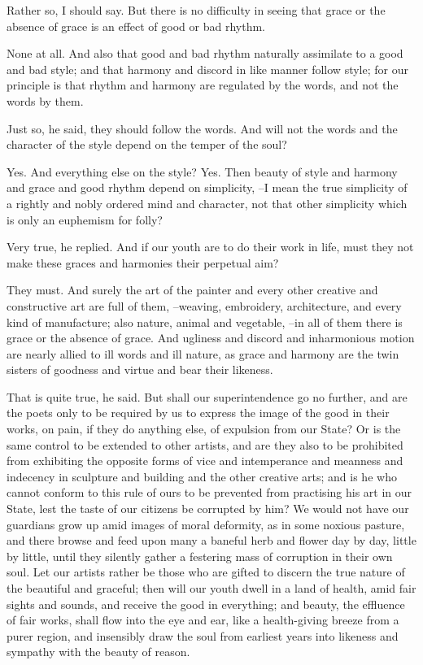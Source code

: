 Rather so, I should say.
But there is no difficulty in seeing that grace or the absence of grace is an effect of good or bad rhythm.

None at all.
And also that good and bad rhythm naturally assimilate to a good and bad style; and that harmony and discord in like manner follow style; for our principle is that rhythm and harmony are regulated by the words, and not the words by them.

Just so, he said, they should follow the words.
And will not the words and the character of the style depend on the temper of the soul?

Yes.
And everything else on the style?
Yes.
Then beauty of style and harmony and grace and good rhythm depend on simplicity, --I mean the true simplicity of a rightly and nobly ordered mind and character, not that other simplicity which is only an euphemism for folly?

Very true, he replied.
And if our youth are to do their work in life, must they not make these graces and harmonies their perpetual aim?

They must.
And surely the art of the painter and every other creative and constructive art are full of them, --weaving, embroidery, architecture, and every kind of manufacture; also nature, animal and vegetable, --in all of them there is grace or the absence of grace. And ugliness and discord and inharmonious motion are nearly allied to ill words and ill nature, as grace and harmony are the twin sisters of goodness and virtue and bear their likeness.

That is quite true, he said.
But shall our superintendence go no further, and are the poets only to be required by us to express the image of the good in their works, on pain, if they do anything else, of expulsion from our State? Or is the same control to be extended to other artists, and are they also to be prohibited from exhibiting the opposite forms of vice and intemperance and meanness and indecency in sculpture and building and the other creative arts; and is he who cannot conform to this rule of ours to be prevented from practising his art in our State, lest the taste of our citizens be corrupted by him? We would not have our guardians grow up amid images of moral deformity, as in some noxious pasture, and there browse and feed upon many a baneful herb and flower day by day, little by little, until they silently gather a festering mass of corruption in their own soul. Let our artists rather be those who are gifted to discern the true nature of the beautiful and graceful; then will our youth dwell in a land of health, amid fair sights and sounds, and receive the good in everything; and beauty, the effluence of fair works, shall flow into the eye and ear, like a health-giving breeze from a purer region, and insensibly draw the soul from earliest years into likeness and sympathy with the beauty of reason.

